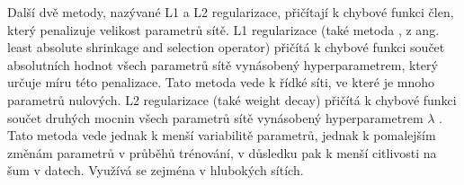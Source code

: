 Další dvě metody, nazývané L1 a L2 regularizace, přičítají k chybové funkci
člen, který penalizuje velikost parametrů sítě. L1 regularizace (také metoda
\cite{lasso}, z ang. least absolute shrinkage and selection operator) přičítá k
chybové funkci součet absolutních hodnot všech parametrů sítě vynásobený
hyperparametrem, který určuje míru této penalizace. Tato metoda vede k řídké
síti, ve které je mnoho parametrů nulových. L2 regularizace (také weight decay)
přičítá k chybové funkci součet druhých mocnin všech parametrů sítě vynásobený
hyperparametrem $\lambda$ \cite{l2}. Tato metoda vede jednak k menší
variabilitě parametrů, jednak k pomalejším změnám parametrů v průběhů
trénování, v důsledku pak k menší citlivosti na šum v datech. Využívá se
zejména v hlubokých sítích.

\endinput